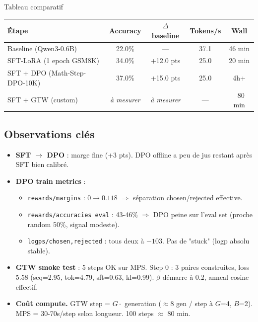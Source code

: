 \documentclass[10pt,a4paper]{article}
\begin{document}
\begin{result}{Tableau comparatif}
\begin{center}
\begin{tabular}{|l|c|c|c|c|}
\hline
\textbf{Étape} & \textbf{Accuracy} & \textbf{$\Delta$ baseline} & \textbf{Tokens/s} & \textbf{Wall} \\
\hline
Baseline (Qwen3-0.6B) & 22.0\% & --- & 37.1 & 46 min \\
SFT-LoRA (1 epoch GSM8K) & 34.0\% & +12.0 pts & 25.0 & 20 min \\
SFT + DPO (Math-Step-DPO-10K) & 37.0\% & +15.0 pts & 25.0 & 4h+ \\
SFT + GTW (custom) & \emph{à mesurer} & \emph{à mesurer} & --- & ~80 min \\
\hline
\end{tabular}
\end{center}
\end{result}

\subsection{Observations clés}

\begin{itemize}[leftmargin=*]
  \item \textbf{SFT $\to$ DPO} : marge fine (+3 pts). DPO offline a peu de jus restant après SFT bien calibré.
  \item \textbf{DPO train metrics} :
    \begin{itemize}
      \item \texttt{rewards/margins} : $0 \to 0.118$ $\Rightarrow$ séparation chosen/rejected effective.
      \item \texttt{rewards/accuracies eval} : 43-46\% $\Rightarrow$ DPO peine sur l'eval set (proche random 50\%, signal modeste).
      \item \texttt{logps/chosen,rejected} : tous deux à $-103$. Pas de "stuck" (logp absolu stable).
    \end{itemize}
  \item \textbf{GTW smoke test} : 5 steps OK sur MPS. Step 0 : 3 paires construites, loss 5.58 (seq=2.95, tok=4.79, sft=0.63, kl=0.99). $\beta$ démarre à 0.2, anneal cosine effectif.
  \item \textbf{Coût compute.} GTW step = $G \cdot$ generation ($\approx 8$ gen / step à $G$=4, $B$=2). MPS = 30-70s/step selon longueur. 100 steps $\approx$ 80 min.
\end{itemize}
\end{document}

